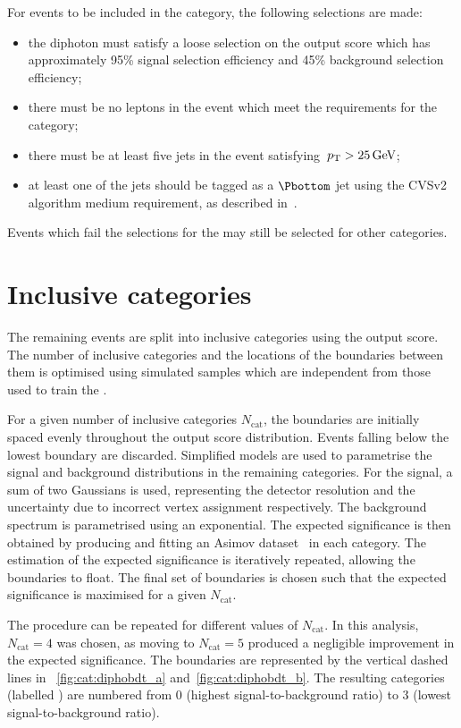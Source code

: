 For events to be included in the \TTHHadronicTag category, the following selections are made:
\begin{itemize}
\item the diphoton must satisfy a loose selection on the \DiPhoBdt output score which has approximately 95\% signal selection efficiency and 45\% background selection efficiency; 
\item there must be no leptons in the event which meet the requirements for the \TTHLeptonicTag category;
\item there must be at least five jets in the event satisfying $\,p_\text{T} >25\,\text{Ge\hspace{-.08em}V}$;
\item at least one of the jets should be tagged as a $\Pbottom$ jet using the CVSv2 algorithm medium requirement, as described in~\cite{bjets}.
\end{itemize}

Events which fail the selections for the \TTHTag\s may still be selected for other categories.

\section{Inclusive categories}
\label{cat:sec:untagged}

The remaining events are split into inclusive categories using the \DiPhoBdt output score. The number of inclusive categories and the locations of the boundaries between them is optimised using simulated samples which are independent from those used to train the \DiPhoBdt. 

For a given number of inclusive categories $N_\text{cat}$, the boundaries are initially spaced evenly throughout the \DiPhoBdt output score distribution. Events falling below the lowest boundary are discarded. Simplified models are used to parametrise the signal and background \mgg distributions in the remaining categories. For the signal, a sum of two Gaussians is used, representing the detector resolution and the uncertainty due to incorrect vertex assignment respectively. The background \mgg spectrum is parametrised using an exponential. The expected significance is then obtained by producing and fitting an Asimov dataset~\cite{Cowan:2010js} in each category. The estimation of the expected significance is iteratively repeated, allowing the boundaries to float. The final set of boundaries is chosen such that the expected significance is maximised for a given $N_\text{cat}$.

The procedure can be repeated for different values of $N_\text{cat}$. In this analysis, $N_\text{cat}=4$ was chosen, as moving to $N_\text{cat}=5$ produced a negligible improvement in the expected significance. The boundaries are represented by the vertical dashed lines in \Fig\s~\ref{fig:cat:diphobdt_a} and~\ref{fig:cat:diphobdt_b}. The resulting categories (labelled \Untagged) are numbered from 0 (highest signal-to-background ratio) to 3 (lowest signal-to-background ratio).

